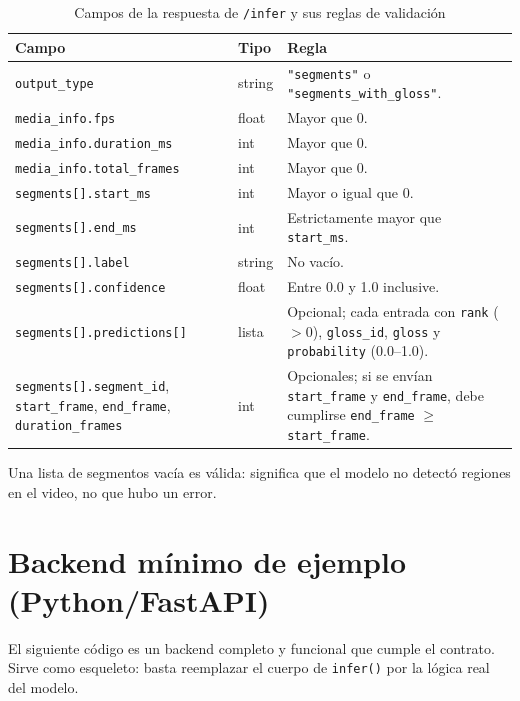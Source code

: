 \documentclass[12pt,a4paper]{article}
\begin{document}
\begin{table}[H]
\centering
\caption{Campos de la respuesta de \texttt{/infer} y sus reglas de validación}
\small
\begin{tabular}{
    >{\raggedright\arraybackslash}p{5.0cm}
    >{\raggedright\arraybackslash}p{1.5cm}
    >{\raggedright\arraybackslash}p{7.8cm}
}
\toprule
\textbf{Campo} & \textbf{Tipo} & \textbf{Regla} \\
\midrule
\texttt{output\_type} & string & \texttt{"segments"} o \texttt{"segments\_with\_gloss"}. \\
\texttt{media\_info.fps} & float & Mayor que 0. \\
\texttt{media\_info.duration\_ms} & int & Mayor que 0. \\
\texttt{media\_info.total\_frames} & int & Mayor que 0. \\
\texttt{segments[].start\_ms} & int & Mayor o igual que 0. \\
\texttt{segments[].end\_ms} & int & Estrictamente mayor que \texttt{start\_ms}. \\
\texttt{segments[].label} & string & No vacío. \\
\texttt{segments[].confidence} & float & Entre 0.0 y 1.0 inclusive. \\
\texttt{segments[].predictions[]} & lista & Opcional; cada entrada con \texttt{rank} ($>$0), \texttt{gloss\_id}, \texttt{gloss} y \texttt{probability} (0.0--1.0). \\
\texttt{segments[].segment\_id}, \texttt{start\_frame}, \texttt{end\_frame}, \texttt{duration\_frames} & int & Opcionales; si se envían \texttt{start\_frame} y \texttt{end\_frame}, debe cumplirse \texttt{end\_frame} $\geq$ \texttt{start\_frame}. \\
\bottomrule
\end{tabular}
\end{table}

Una lista de segmentos vacía es válida: significa que el modelo no detectó regiones en el video, no que hubo un error.

\section{Backend mínimo de ejemplo (Python/FastAPI)}

El siguiente código es un backend completo y funcional que cumple el contrato. Sirve como esqueleto: basta reemplazar el cuerpo de \texttt{infer()} por la lógica real del modelo.
\end{document}
